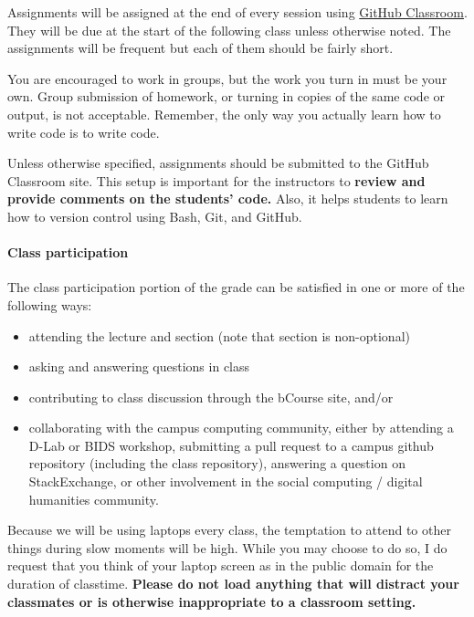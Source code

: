 \documentclass[
]{article}
\providecommand{\tightlist}{%
  \setlength{\itemsep}{0pt}\setlength{\parskip}{0pt}}
\begin{document}
Assignments will be assigned at the end of every session using
\href{https://classroom.github.com/classrooms/72813915-ps239t-spring-2021}{GitHub
Classroom}. They will be due at the start of the following class unless
otherwise noted. The assignments will be frequent but each of them
should be fairly short.

You are encouraged to work in groups, but the work you turn in must be
your own. Group submission of homework, or turning in copies of the same
code or output, is not acceptable. Remember, the only way you actually
learn how to write code is to write code.

Unless otherwise specified, assignments should be submitted to the
GitHub Classroom site. This setup is important for the instructors to
\textbf{review and provide comments on the students' code.} Also, it
helps students to learn how to version control using Bash, Git, and
GitHub.

\hypertarget{class-participation}{%
\paragraph{Class participation}\label{class-participation}}

The class participation portion of the grade can be satisfied in one or
more of the following ways:

\begin{itemize}
\tightlist
\item
  attending the lecture and section (note that section is non-optional)
\item
  asking and answering questions in class
\item
  contributing to class discussion through the bCourse site, and/or
\item
  collaborating with the campus computing community, either by attending
  a D-Lab or BIDS workshop, submitting a pull request to a campus github
  repository (including the class repository), answering a question on
  StackExchange, or other involvement in the social computing / digital
  humanities community.
\end{itemize}

Because we will be using laptops every class, the temptation to attend
to other things during slow moments will be high. While you may choose
to do so, I do request that you think of your laptop screen as in the
public domain for the duration of classtime. \textbf{Please do not load
anything that will distract your classmates or is otherwise
inappropriate to a classroom setting.}
\end{document}
